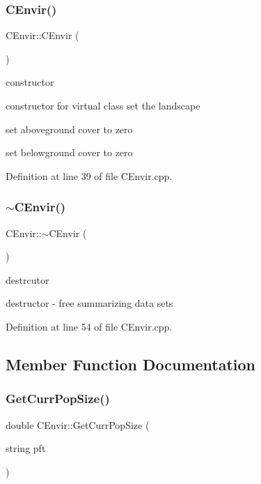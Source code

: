 \subsubsection{\texorpdfstring{CEnvir()}{CEnvir()}}
{\footnotesize\ttfamily C\+Envir\+::\+C\+Envir (\begin{DoxyParamCaption}{ }\end{DoxyParamCaption})}



constructor 

constructor for virtual class set the landscape

set aboveground cover to zero

set belowground cover to zero 

Definition at line 39 of file C\+Envir.\+cpp.

\mbox{\label{class_c_envir_ad6755aa813da52b40a7c8a6a10030a73}} 
\subsubsection{\texorpdfstring{$\sim$CEnvir()}{~CEnvir()}}
{\footnotesize\ttfamily C\+Envir\+::$\sim$\+C\+Envir (\begin{DoxyParamCaption}{ }\end{DoxyParamCaption})\hspace{0.3cm}{\ttfamily [virtual]}}



destrcutor 

destructor -\/ free summarizing data sets 

Definition at line 54 of file C\+Envir.\+cpp.



\subsection{Member Function Documentation}
\mbox{\label{class_c_envir_ac680039ac2dad8a7df749a73b556d5fc}} 
\subsubsection{\texorpdfstring{GetCurrPopSize()}{GetCurrPopSize()}}
{\footnotesize\ttfamily double C\+Envir\+::\+Get\+Curr\+Pop\+Size (\begin{DoxyParamCaption}\item[{string}]{pft }\end{DoxyParamCaption})}



